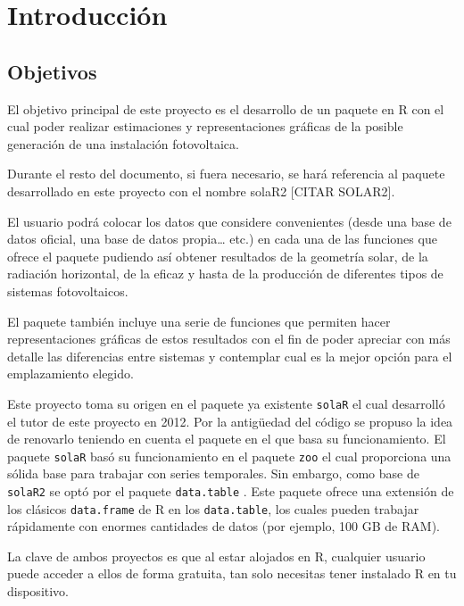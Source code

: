 \chapter{Introducción}
\label{chap:introduccion}

\section{Objetivos}
\label{sec:org18c889f}
\label{sec:objetivos}
El objetivo principal de este proyecto es el desarrollo de un paquete en R \cite{rcoreteam23} con el cual poder realizar estimaciones y representaciones gráficas de la posible generación de una instalación fotovoltaica.

Durante el resto del documento, si fuera necesario, se hará referencia al paquete desarrollado en este proyecto con el nombre solaR2 [CITAR SOLAR2].

El usuario podrá colocar los datos que considere convenientes (desde una base de datos oficial, una base de datos propia\ldots{} etc.) en cada una de las funciones que ofrece el paquete pudiendo así obtener resultados de la geometría solar, de la radiación horizontal, de la eficaz y hasta de la producción de diferentes tipos de sistemas fotovoltaicos.

El paquete también incluye una serie de funciones que permiten hacer representaciones gráficas de estos resultados con el fin de poder apreciar con más detalle las diferencias entre sistemas y contemplar cual es la mejor opción para el emplazamiento elegido.

Este proyecto toma su origen en el paquete ya existente \texttt{solaR} \cite{perpinan12} el cual desarrolló el tutor de este proyecto en 2012. Por la antigüedad del código se propuso la idea de renovarlo teniendo en cuenta el paquete en el que basa su funcionamiento. El paquete \texttt{solaR} basó su funcionamiento en el paquete \texttt{zoo} \cite{zeileis05} el cual proporciona una sólida base para trabajar con series temporales. Sin embargo, como base de \texttt{solaR2} se optó por el paquete \texttt{data.table} \cite{barrett24}. Este paquete ofrece una extensión de los clásicos \texttt{data.frame} de R en los \texttt{data.table}, los cuales pueden trabajar rápidamente con enormes cantidades de datos (por ejemplo, 100 GB de RAM).

La clave de ambos proyectos es que al estar alojados en R, cualquier usuario puede acceder a ellos de forma gratuita, tan solo necesitas tener instalado R en tu dispositivo.

